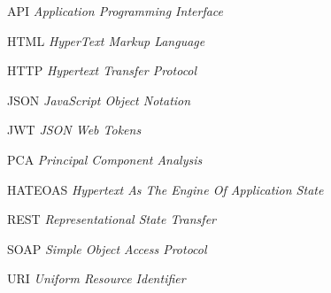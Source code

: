 \begin{siglas}
  \item[API] \textit{Application Programming Interface}
  \item[HTML] \textit{HyperText Markup Language}
  \item[HTTP] \textit{Hypertext Transfer Protocol}
  \item[JSON] \textit{JavaScript Object Notation}
  \item[JWT] \textit{JSON Web Tokens}
  \item[PCA] \textit{Principal Component Analysis}
  \item[HATEOAS] \textit{Hypertext As The Engine Of Application State}
  \item[REST] \textit{Representational State Transfer}
  \item[SOAP] \textit{Simple Object Access Protocol}
  \item[URI] \textit{Uniform Resource Identifier}
\end{siglas}
